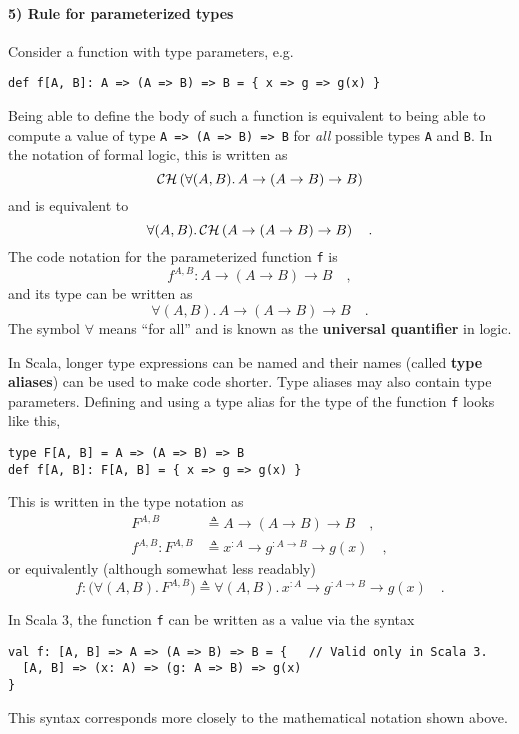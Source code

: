 \paragraph{5) Rule for parameterized types}

Consider a function with type parameters, e.g.
\begin{lstlisting}
def f[A, B]: A => (A => B) => B = { x => g => g(x) }
\end{lstlisting}
Being able to define the body of such a function is equivalent to
being able to compute a value of type \lstinline!A => (A => B) => B!
for \emph{all} possible types \lstinline!A! and \lstinline!B!. In
the notation of formal logic, this is written as
\[
{\cal CH}\left(\forall(A,B).\,A\rightarrow(A\rightarrow B)\rightarrow B\right)
\]
and is equivalent to
\[
\forall(A,B).\,{\cal CH}\left(A\rightarrow(A\rightarrow B)\rightarrow B\right)\quad.
\]
The code notation for the parameterized function \lstinline!f! is
\[
f^{A,B}:A\rightarrow\left(A\rightarrow B\right)\rightarrow B\quad,
\]
and its type can be written as
\[
\forall(A,B).\,A\rightarrow\left(A\rightarrow B\right)\rightarrow B\quad.
\]
The symbol $\forall$ means ``for all'' and is known as the \textbf{universal
quantifier} in logic.

In Scala, longer type expressions can be named and their names (called
\textbf{type aliases}) can be used to make code
shorter. Type aliases may also contain type parameters. Defining and
using a type alias for the type of the function \lstinline!f! looks
like this,
\begin{lstlisting}
type F[A, B] = A => (A => B) => B
def f[A, B]: F[A, B] = { x => g => g(x) }
\end{lstlisting}
This is written in the type notation as
\begin{align*}
F^{A,B} & \triangleq A\rightarrow\left(A\rightarrow B\right)\rightarrow B\quad,\\
f^{A,B}:F^{A,B} & \triangleq x^{:A}\rightarrow g^{:A\rightarrow B}\rightarrow g(x)\quad,
\end{align*}
or equivalently (although somewhat less readably)
\[
f:\big(\forall(A,B).\,F^{A,B}\big)\triangleq\forall(A,B).\,x^{:A}\rightarrow g^{:A\rightarrow B}\rightarrow g(x)\quad.
\]

In Scala 3, the function \lstinline!f! can be written as a value
via the syntax
\begin{lstlisting}
val f: [A, B] => A => (A => B) => B = {   // Valid only in Scala 3.
  [A, B] => (x: A) => (g: A => B) => g(x)
}
\end{lstlisting}
This syntax corresponds more closely to the mathematical notation
shown above.

